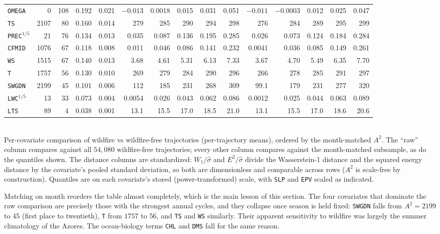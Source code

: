 \documentclass[11pt]{article}
\begin{document}
\begin{center}
\begin{tabular}{lrrrrrrrrrrrrrr}
\texttt{OMEGA} & 0 & 108 & 0.192 & 0.021 & $-0.013$ & 0.0018 & 0.015 & 0.031 & 0.051 & $-0.011$ & $-0.0003$ & 0.012 & 0.025 & 0.047 \\
\texttt{TS} & 2107 & 80 & 0.160 & 0.014 & 279 & 285 & 290 & 294 & 298 & 276 & 284 & 289 & 295 & 299 \\
\texttt{PREC}$^{1/5}$ & 21 & 76 & 0.134 & 0.013 & 0.035 & 0.087 & 0.136 & 0.195 & 0.285 & 0.026 & 0.073 & 0.124 & 0.184 & 0.284 \\
\texttt{CFMID} & 1076 & 67 & 0.118 & 0.008 & 0.011 & 0.046 & 0.086 & 0.141 & 0.232 & 0.0041 & 0.036 & 0.085 & 0.149 & 0.261 \\
\texttt{WS} & 1515 & 67 & 0.140 & 0.013 & 3.68 & 4.61 & 5.31 & 6.13 & 7.33 & 3.67 & 4.70 & 5.49 & 6.35 & 7.70 \\
\texttt{T} & 1757 & 56 & 0.130 & 0.010 & 269 & 279 & 284 & 290 & 296 & 266 & 278 & 285 & 291 & 297 \\
\texttt{SWGDN} & 2199 & 45 & 0.101 & 0.006 & 112 & 185 & 231 & 268 & 309 & 99.1 & 179 & 231 & 277 & 320 \\
\texttt{LWC}$^{1/5}$ & 13 & 33 & 0.073 & 0.004 & 0.0054 & 0.026 & 0.043 & 0.062 & 0.086 & 0.0012 & 0.025 & 0.044 & 0.063 & 0.089 \\
\texttt{LTS} & 89 & 4 & 0.038 & 0.001 & 13.1 & 15.5 & 17.0 & 18.5 & 21.0 & 13.1 & 15.5 & 17.0 & 18.6 & 20.6 \\
\bottomrule
\end{tabular}\\[2pt]
{\footnotesize Per-covariate comparison of wildfire vs wildfire-free trajectories
(per-trajectory means), ordered by the month-matched $A^2$. The ``raw'' column compares
against all $54{,}080$ wildfire-free trajectories; every other column compares against the
month-matched subsample, as do the quantiles shown. The distance columns are standardized:
$W_1/\hat\sigma$ and $E^2/\hat\sigma$ divide the Wasserstein-1 distance and the squared
energy distance by the covariate's pooled standard deviation, so both are dimensionless and
comparable across rows ($A^2$ is scale-free by construction). Quantiles are on each
covariate's stored (power-transformed) scale, with \texttt{SLP} and \texttt{EPV} scaled as
indicated.}
\end{center}

Matching on month reorders the table almost completely, which is the main lesson of this
section. The four covariates that dominate the raw comparison are precisely those with the
strongest annual cycles, and they collapse once season is held fixed: \texttt{SWGDN} falls
from $A^2=2199$ to $45$ (first place to twentieth), \texttt{T} from $1757$ to $56$, and
\texttt{TS} and \texttt{WS} similarly. Their apparent sensitivity to wildfire was largely
the summer climatology of the Azores. The ocean-biology terms \texttt{CHL} and \texttt{DMS}
fall for the same reason.
\end{document}
